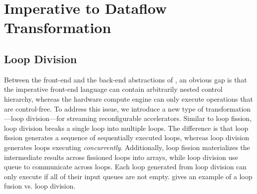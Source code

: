 \section{Imperative to Dataflow Transformation}
\label{sec:control}



\subsection{Loop Division}\label{sec:loopdiv}
Between the front-end and the back-end abstractions of \name, an obvious gap is that 
the imperative front-end language can contain arbitrarily nested control hierarchy, whereas
the hardware compute engine can only execute operations that are control-free.
To address this issue, we introduce a new type of transformation---loop division---for streaming reconfigurable
accelerators.
Similar to loop fission, loop division breaks a single loop into multiple loops.
The difference is that loop fission generates a sequence of sequentially executed loops, whereas
loop division generates loops executing \emph{concurrently}.
Additionally, loop fission materializes the intermediate results across fissioned loops into arrays,
while loop division use queue to communicate across loops.
Each loop generated from loop division can only execute if all of their input queues are not empty.
 gives an example of a loop fusion vs. loop division.

